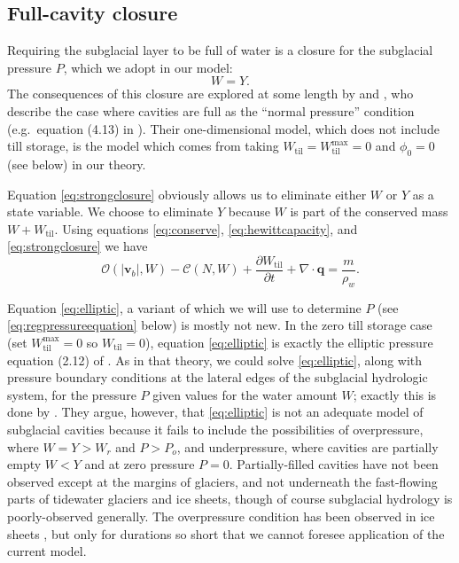 \documentclass[gmd]{copernicus}   %
\newcommand{\text}{\textrm}
\newcommand\bv{\mathbf{v}}
\newcommand\bq{\mathbf{q}}
\newcommand{\ddt}[1]{\ensuremath{\frac{\partial #1}{\partial t}}}
\newcommand{\Div}{\nabla\cdot}
\newcommand{\Wtil}{W_{\text{til}}}
\newcommand{\Wtilmax}{W_{\text{til}}^{\text{max}}}
\begin{document}
\subsection{Full-cavity closure}  Requiring the subglacial layer to be full of water is a closure for the subglacial pressure $P$, which we adopt in our model:
\begin{equation}
W = Y.\label{eq:strongclosure}
\end{equation}
The consequences of this closure are explored at some length by \cite{Schoofetal2012} and \cite{Hewittetal2012}, who describe the case where cavities are full as the ``normal pressure'' condition (e.g.~equation (4.13) in \cite{Schoofetal2012}).  Their one-dimensional model, which does not include till storage, is the model which comes from taking $\Wtil=\Wtilmax=0$ and $\phi_0=0$ (see below) in our theory.

Equation \eqref{eq:strongclosure} obviously allows us to eliminate either $W$ or $Y$ as a state variable.  We choose to eliminate $Y$ because $W$ is part of the conserved mass $W + \Wtil$.  Using equations \eqref{eq:conserve}, \eqref{eq:hewittcapacity}, and \eqref{eq:strongclosure} we have
\begin{equation}
\mathcal{O}(|\bv_b|,W) - \mathcal{C}(N,W) + \ddt{\Wtil} + \Div\bq = \frac{m}{\rho_w}. \label{eq:elliptic}
\end{equation}

Equation \eqref{eq:elliptic}, a variant of which we will use to determine $P$ (see \eqref{eq:regpressureequation} below) is mostly not new.  In the zero till storage case (set $\Wtilmax=0$ so $\Wtil=0$), equation \eqref{eq:elliptic} is exactly the elliptic pressure equation (2.12) of \cite{Schoofetal2012}.  As in that theory, we could solve \eqref{eq:elliptic}, along with pressure boundary conditions at the lateral edges of the subglacial hydrologic system, for the pressure $P$ given values for the water amount $W$; exactly this is done by \cite{Schoofetal2012}.  They argue, however, that \eqref{eq:elliptic} is not an adequate model of subglacial cavities because it fails to include the possibilities of overpressure, where $W=Y>W_r$ and $P>P_o$, and underpressure, where cavities are partially empty $W<Y$ and at zero pressure $P=0$.  Partially-filled cavities have not been observed except at the margins of glaciers, and not underneath the fast-flowing parts of tidewater glaciers and ice sheets, though of course subglacial hydrology is poorly-observed generally.  The overpressure condition has been observed in ice sheets \citep[for example]{Dasetal08}, but only for durations so short that we cannot foresee application of the current model.
\end{document}
